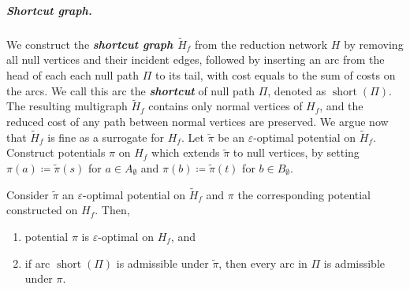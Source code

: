 \documentclass[a4paper,UKenglish]{socg-lipics-v2018}
\makeatletter
\def\note#1{\textcolor{red}{{#1}}}
\def\eps{\varepsilon}
\def\short{\operatorname{short}}
\theoremstyle{plain}
\numberwithin{figure}{section}
\renewcommand{\paragraph}{\subparagraph}
\def\EMPH#1{\textbf{\emph{\boldmath #1}}}
\def\n@te#1{\textsf{\boldmath \textbf{$\langle\!\langle$#1$\rangle\!\rangle$}}\leavevmode}
\def\note#1{\textcolor{red}{\n@te{#1}}}
\makeatother
\begin{document}
\paragraph{Shortcut graph.}
We construct the \EMPH{shortcut graph $\tilde{H}_f$} from the reduction network $H$ by removing all
null vertices and their incident edges, followed by inserting an arc
from the head of each each null path $\Pi$ to its tail, with cost equals to the sum of costs on the arcs.
We call this arc the \EMPH{shortcut} of null path $\Pi$, denoted as \EMPH{$\short(\Pi)$}.
%
The resulting multigraph $\tilde{H}_f$ contains only normal vertices of $H_f$, and the reduced cost of any path between normal vertices are preserved.
%
We argue now that $\tilde{H}_f$ is fine as a surrogate for $H_f$.
%
Let $\tilde{\pi}$ be an $\eps$-optimal potential on $\tilde{H}_f$.
Construct potentials $\pi$ on $H_f$ which extends $\tilde{\pi}$ to null vertices, by
setting $\pi(a) \coloneqq \tilde{\pi}(s)$ for $a \in A_\emptyset$ and
$\pi(b) \coloneqq \tilde{\pi}(t)$ for $b \in B_\emptyset$.

\begin{lemmarep}
\label{lemma:empty_correct}
Consider $\tilde{\pi}$ an $\eps$-optimal potential on $\tilde{H}_f$ and $\pi$ the corresponding potential constructed on $H_f$.
Then,
\begin{enumerate}
\item potential $\pi$ is $\eps$-optimal on  $H_f$, and
\item if arc $\short(\Pi)$ is admissible under $\tilde{\pi}$, then every arc in $\Pi$ is admissible under $\pi$.
\end{enumerate}
\end{lemmarep}
\end{document}

